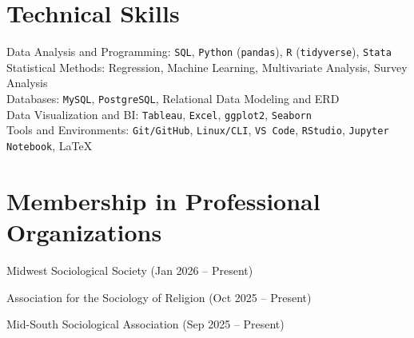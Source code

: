 \documentclass[letterpaper,10pt]{article}
\begin{document}
    \section{Technical Skills}
    Data Analysis and Programming: \texttt{SQL}, \texttt{Python} (\texttt{pandas}), \texttt{R} (\texttt{tidyverse}), \texttt{Stata}\\
    Statistical Methods: Regression, Machine Learning, Multivariate Analysis, Survey Analysis\\
    Databases: \texttt{MySQL}, \texttt{PostgreSQL}, Relational Data Modeling and ERD\\
    Data Visualization and BI: \texttt{Tableau}, \texttt{Excel}, \texttt{ggplot2}, \texttt{Seaborn}\\
    Tools and Environments: \texttt{Git/GitHub}, \texttt{Linux/CLI}, \texttt{VS Code}, \texttt{RStudio}, \texttt{Jupyter Notebook}, \LaTeX
    \vspace{0.65em}

    \section{Membership in Professional Organizations}
    \begin{description}[font=$\bullet$]
        \item{Midwest Sociological Society (Jan 2026 – Present)}
        \item{Association for the Sociology of Religion (Oct 2025 – Present)}
        \item{Mid-South Sociological Association (Sep 2025 – Present)}
    \end{description}
    \vspace{0.65em}

\end{document}
